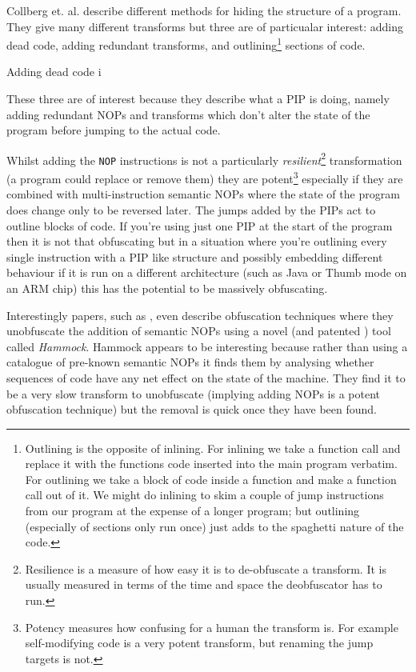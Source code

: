 \documentclass[12pt,]{book}
\begin{document}
Collberg et. al. \autocite{Collberg:1997vt} describe different methods
for hiding the structure of a program. They give many different
transforms but three are of particualar interest: adding dead code,
adding redundant transforms, and outlining\footnote{Outlining is the
  opposite of inlining. For inlining we take a function call and replace
  it with the functions code inserted into the main program verbatim.
  For outlining we take a block of code inside a function and make a
  function call out of it. We might do inlining to skim a couple of jump
  instructions from our program at the expense of a longer program; but
  outlining (especially of sections only run once) just adds to the
  spaghetti nature of the code.} sections of code.

Adding dead code i

These three are of interest because they describe what a PIP is doing,
namely adding redundant NOPs and transforms which don't alter the state
of the program before jumping to the actual code.

Whilst adding the \lstinline!NOP! instructions is not a particularly
\emph{resilient}\footnote{Resilience is a measure of how easy it is to
  de-obfuscate a transform. It is usually measured in terms of the time
  and space the deobfuscator has to run.} transformation (a program
could replace or remove them) they are potent\footnote{Potency measures
  how confusing for a human the transform is. For example self-modifying
  code is a very potent transform, but renaming the jump targets is not.}
especially if they are combined with multi-instruction semantic NOPs
where the state of the program does change only to be reversed later.
The jumps added by the PIPs act to outline blocks of code. If you're
using just one PIP at the start of the program then it is not that
obfuscating but in a situation where you're outlining every single
instruction with a PIP like structure and possibly embedding different
behaviour if it is run on a different architecture (such as Java or
Thumb mode on an ARM chip) this has the potential to be massively
obfuscating.

Interestingly papers, such as
\autocite{Christodorescu:2005vh}\autocite{Christodorescu:2005vf}, even
describe obfuscation techniques where they unobfuscate the addition of
semantic NOPs using a novel (and patented
\autocite{Christodorescu:2009wo}) tool called \emph{Hammock}. Hammock
appears to be interesting because rather than using a catalogue of
pre-known semantic NOPs it finds them by analysing whether sequences of
code have any net effect on the state of the machine. They find it to be
a very slow transform to unobfuscate (implying adding NOPs is a potent
obfuscation technique) but the removal is quick once they have been
found.
\end{document}
